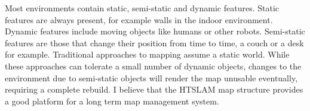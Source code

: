 Most environments contain static, semi-static and dynamic
features. Static features are always present, for example walls in the
indoor environment. Dynamic features include moving objects like
humans or other robots. Semi-static features are those that change
their position from time to time, a couch or a desk for
example. Traditional approaches to mapping assume a static world. While
these approaches can tolerate a small number of dynamic objects,
changes to the environment due to semi-static objects will render the
map unusable eventually, requiring a complete rebuild. I believe that
the HTSLAM map structure provides a good platform for a long term map
management system.




